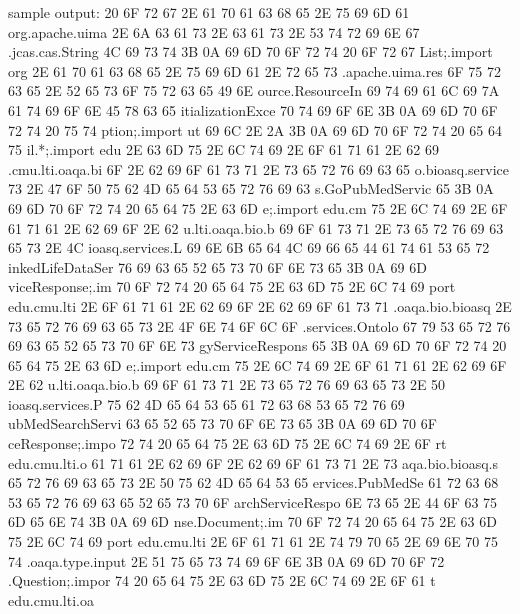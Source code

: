 \begin{chunk}{sample output:}
    20 6F 72 67 2E 61 70 61 63 68 65 2E 75 69 6D 61          org.apache.uima
    2E 6A 63 61 73 2E 63 61 73 2E 53 74 72 69 6E 67         .jcas.cas.String
    4C 69 73 74 3B 0A 69 6D 70 6F 72 74 20 6F 72 67         List;.import org
    2E 61 70 61 63 68 65 2E 75 69 6D 61 2E 72 65 73         .apache.uima.res
    6F 75 72 63 65 2E 52 65 73 6F 75 72 63 65 49 6E         ource.ResourceIn
    69 74 69 61 6C 69 7A 61 74 69 6F 6E 45 78 63 65         itializationExce
    70 74 69 6F 6E 3B 0A 69 6D 70 6F 72 74 20 75 74         ption;.import ut
    69 6C 2E 2A 3B 0A 69 6D 70 6F 72 74 20 65 64 75         il.*;.import edu
    2E 63 6D 75 2E 6C 74 69 2E 6F 61 71 61 2E 62 69         .cmu.lti.oaqa.bi
    6F 2E 62 69 6F 61 73 71 2E 73 65 72 76 69 63 65         o.bioasq.service
    73 2E 47 6F 50 75 62 4D 65 64 53 65 72 76 69 63         s.GoPubMedServic
    65 3B 0A 69 6D 70 6F 72 74 20 65 64 75 2E 63 6D         e;.import edu.cm
    75 2E 6C 74 69 2E 6F 61 71 61 2E 62 69 6F 2E 62         u.lti.oaqa.bio.b
    69 6F 61 73 71 2E 73 65 72 76 69 63 65 73 2E 4C         ioasq.services.L
    69 6E 6B 65 64 4C 69 66 65 44 61 74 61 53 65 72         inkedLifeDataSer
    76 69 63 65 52 65 73 70 6F 6E 73 65 3B 0A 69 6D         viceResponse;.im
    70 6F 72 74 20 65 64 75 2E 63 6D 75 2E 6C 74 69         port edu.cmu.lti
    2E 6F 61 71 61 2E 62 69 6F 2E 62 69 6F 61 73 71         .oaqa.bio.bioasq
    2E 73 65 72 76 69 63 65 73 2E 4F 6E 74 6F 6C 6F         .services.Ontolo
    67 79 53 65 72 76 69 63 65 52 65 73 70 6F 6E 73         gyServiceRespons
    65 3B 0A 69 6D 70 6F 72 74 20 65 64 75 2E 63 6D         e;.import edu.cm
    75 2E 6C 74 69 2E 6F 61 71 61 2E 62 69 6F 2E 62         u.lti.oaqa.bio.b
    69 6F 61 73 71 2E 73 65 72 76 69 63 65 73 2E 50         ioasq.services.P
    75 62 4D 65 64 53 65 61 72 63 68 53 65 72 76 69         ubMedSearchServi
    63 65 52 65 73 70 6F 6E 73 65 3B 0A 69 6D 70 6F         ceResponse;.impo
    72 74 20 65 64 75 2E 63 6D 75 2E 6C 74 69 2E 6F         rt edu.cmu.lti.o
    61 71 61 2E 62 69 6F 2E 62 69 6F 61 73 71 2E 73         aqa.bio.bioasq.s
    65 72 76 69 63 65 73 2E 50 75 62 4D 65 64 53 65         ervices.PubMedSe
    61 72 63 68 53 65 72 76 69 63 65 52 65 73 70 6F         archServiceRespo
    6E 73 65 2E 44 6F 63 75 6D 65 6E 74 3B 0A 69 6D         nse.Document;.im
    70 6F 72 74 20 65 64 75 2E 63 6D 75 2E 6C 74 69         port edu.cmu.lti
    2E 6F 61 71 61 2E 74 79 70 65 2E 69 6E 70 75 74         .oaqa.type.input
    2E 51 75 65 73 74 69 6F 6E 3B 0A 69 6D 70 6F 72         .Question;.impor
    74 20 65 64 75 2E 63 6D 75 2E 6C 74 69 2E 6F 61         t edu.cmu.lti.oa

\end{chunk}
